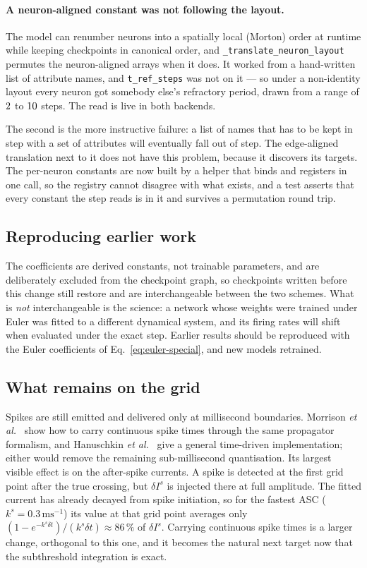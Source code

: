 \documentclass[11pt,a4paper,numbers=noenddot]{scrartcl}
\newcommand{\dt}{\delta t}
\newcommand{\code}[1]{\texttt{\small #1}}
\begin{document}
\paragraph{A neuron-aligned constant was not following the layout.}
The model can renumber neurons into a spatially local (Morton) order at
runtime while keeping checkpoints in canonical order, and
\code{\_translate\_neuron\_layout} permutes the neuron-aligned arrays when it
does. It worked from a hand-written list of attribute names, and
\code{t\_ref\_steps} was not on it --- so under a non-identity layout every
neuron got somebody else's refractory period, drawn from a range of
$2$ to $10$ steps. The read is live in both backends.

The second is the more instructive failure: a list of names that has to be
kept in step with a set of attributes will eventually fall out of step. The
edge-aligned translation next to it does not have this problem, because it
discovers its targets. The per-neuron constants are now built by a helper that
binds and registers in one call, so the registry cannot disagree with what
exists, and a test asserts that every constant the step reads is in it and
survives a permutation round trip.

\subsection{Reproducing earlier work}

The coefficients are derived constants, not trainable parameters, and are
deliberately excluded from the checkpoint graph, so checkpoints written before
this change still restore and are interchangeable between the two schemes.
What is \emph{not} interchangeable is the science: a network whose weights
were trained under Euler was fitted to a different dynamical system, and
its firing rates will shift when evaluated under the exact step. Earlier
results should be reproduced with the Euler coefficients of
Eq.~\eqref{eq:euler-special}, and new models retrained.

\subsection{What remains on the grid}

Spikes are still emitted and delivered only at millisecond boundaries.
Morrison \emph{et al.}~\cite{morrison2007exact} show how to carry continuous
spike times through the same propagator formalism, and
Hanuschkin \emph{et al.}~\cite{hanuschkin2010general} give a general
time-driven implementation; either would remove the remaining sub-millisecond
quantisation. Its largest visible effect is on the after-spike currents.
A spike is detected at the first grid point after the true crossing, but
$\delta I^{s}$ is injected there at full amplitude. The fitted current has
already decayed from spike initiation, so for the fastest ASC
($k^{s} = 0.3\,\mathrm{ms}^{-1}$) its value at that grid point averages only
$(1-e^{-k^{s}\dt})/(k^{s}\dt) \approx 86\,\%$ of $\delta I^{s}$. Carrying continuous spike times
is a larger change, orthogonal to this one, and it becomes the natural next target now
that the subthreshold integration is exact.
\end{document}
